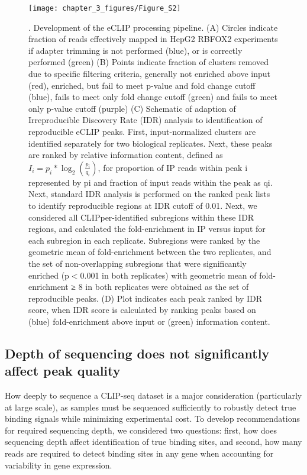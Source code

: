 \begin{figure}[ht]
  \centering
  \texttt{[image: chapter\_3\_figures/Figure\_S2]}
  \caption[Supplementary Figure 2]{. Development of the eCLIP processing pipeline. (A) Circles indicate fraction of reads effectively mapped in HepG2 RBFOX2 experiments if adapter trimming is not performed (blue), or is correctly performed (green) (B) Points indicate fraction of clusters removed due to specific filtering criteria, generally not enriched above input (red), enriched, but fail to meet p-value and fold change cutoff (blue), fails to meet only fold change cutoff (green) and fails to meet only p-value cutoff (purple) (C) Schematic of adaption of Irreproducible Discovery Rate (IDR) analysis to identification of reproducible eCLIP peaks. First, input-normalized clusters are identified separately for two biological replicates. Next, these peaks are ranked by relative information content, defined as $I_i=p_i*\log_2(\frac{p_i}{q_i})$, for proportion of IP reads within peak i represented by pi and fraction of input reads within the peak as qi. Next, standard IDR analysis is performed on the ranked peak lists to identify reproducible regions at IDR cutoff of 0.01. Next, we considered all CLIPper-identified subregions within these IDR regions, and calculated the fold-enrichment in IP versus input for each subregion in each replicate. Subregions were ranked by the geometric mean of fold-enrichment between the two replicates, and the set of non-overlapping subregions that were significantly enriched (p$<$0.001 in both replicates) with geometric mean of fold-enrichment ≥ 8 in both replicates were obtained as the set of reproducible peaks. (D) Plot indicates each peak ranked by IDR score, when IDR score is calculated by ranking peaks based on (blue) fold-enrichment above input or (green) information content.}
  \label{fig:Figure_S2}
\end{figure}


\subsection{Depth of sequencing does not significantly affect peak quality}
How deeply to sequence a CLIP-seq dataset is a major consideration (particularly at large scale), as samples must be sequenced sufficiently to robustly detect true binding signals while minimizing experimental cost. To develop recommendations for required sequencing depth, we considered two questions: first, how does sequencing depth affect identification of true binding sites, and second, how many reads are required to detect binding sites in any gene when accounting for variability in gene expression.

